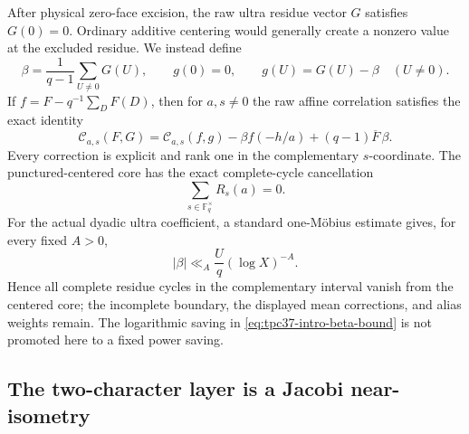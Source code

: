 After physical zero-face excision, the raw ultra residue vector $G$
satisfies $G(0)=0$.  Ordinary additive centering would generally
create a nonzero value at the excluded residue.  We instead define
\begin{equation}
 \beta=\frac1{q-1}\sum_{U\ne0}G(U),\qquad
 g(0)=0,\qquad g(U)=G(U)-\beta\quad(U\ne0).
 \label{eq:tpc37-intro-punctured-centering}
\end{equation}
If $f=F-q^{-1}\sum_D F(D)$, then for $a,s\ne0$ the raw affine
correlation satisfies the exact identity
\begin{equation}
 \mathcal C_{a,s}(F,G)
 =\mathcal C_{a,s}(f,g)
 -\beta f(-h/a)+(q-1)\overline F\,\beta.
 \label{eq:tpc37-intro-punctured-identity}
\end{equation}
Every correction is explicit and rank one in the complementary
\(s\)-coordinate.  The punctured-centered core
has the exact complete-cycle cancellation
\begin{equation}
 \sum_{s\in\mathbb F_q^\times}R_s(a)=0.
 \label{eq:tpc37-intro-complete-cycle}
\end{equation}
For the actual dyadic ultra coefficient, a standard one-M\"obius
estimate gives, for every fixed $A>0$,
\begin{equation}
 |\beta|\ll_A\frac Uq(\log X)^{-A}.
 \label{eq:tpc37-intro-beta-bound}
\end{equation}
Hence all complete residue cycles in the complementary interval vanish
from the centered core; the incomplete boundary, the displayed mean
corrections, and alias weights remain.  The logarithmic saving in
\eqref{eq:tpc37-intro-beta-bound} is not promoted here to a fixed power
saving.

\subsection{The two-character layer is a Jacobi near-isometry}


